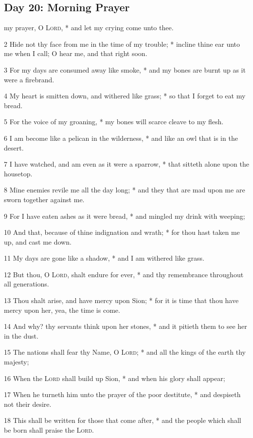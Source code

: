 \subsection{Day 20: Morning Prayer}
 my prayer, O {\textsc{Lord}}, * and let my crying come unto thee.\par
2 Hide not thy face from me in the time of my trouble; * incline thine ear unto me when I call; O hear me, and that right soon.\par
3 For my days are consumed away like smoke, * and my bones are burnt up as it were a firebrand.\par
4 My heart is smitten down, and withered like grass; * so that I forget to eat my bread.\par
5 For the voice of my groaning, * my bones will scarce cleave to my flesh.\par
6 I am become like a pelican in the wilderness, * and like an owl that is in the desert.\par
7 I have watched, and am even as it were a sparrow, * that sitteth alone upon the housetop.\par
8 Mine enemies revile me all the day long; * and they that are mad upon me are sworn together against me.\par
9 For I have eaten ashes as it were bread, * and mingled my drink with weeping;\par
10 And that, because of thine indignation and wrath; * for thou hast taken me up, and cast me down.\par
11 My days are gone like a shadow, * and I am withered like grass.\par
12 But thou, O {\textsc{Lord}}, shalt endure for ever, * and thy remembrance throughout all generations.\par
13 Thou shalt arise, and have mercy upon Sion; * for it is time that thou have mercy upon her, yea, the time is come.\par
14 And why? thy servants think upon her stones, * and it pitieth them to see her in the dust.\par
15 The nations shall fear thy Name, O {\textsc{Lord}}; * and all the kings of the earth thy majesty;\par
16 When the {\textsc{Lord}} shall build up Sion, * and when his glory shall appear;\par
17 When he turneth him unto the prayer of the poor destitute, * and despiseth not their desire.\par
18 This shall be written for those that come after, * and the people which shall be born shall praise the {\textsc{Lord}}.\par
